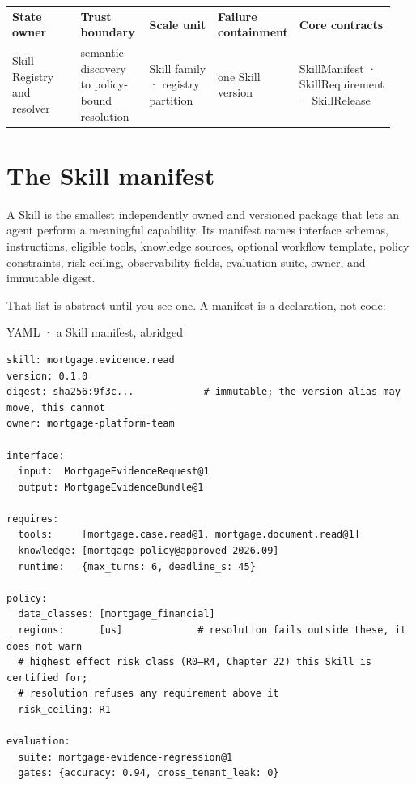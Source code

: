 \BookTableStart
\fontsize{7.2}{9}\selectfont
\begin{tabular}{@{}Y{0.1880\linewidth}Y{0.1880\linewidth}Y{0.1880\linewidth}Y{0.1880\linewidth}Y{0.1880\linewidth}@{}}
\color{white}\bfseries \textbf{State owner} & \color{white}\bfseries \textbf{Trust boundary} & \color{white}\bfseries \textbf{Scale unit} & \color{white}\bfseries \textbf{Failure containment} & \color{white}\bfseries \textbf{Core contracts} \\
Skill Registry and resolver & semantic discovery to policy-bound resolution & Skill family · registry partition & one Skill version & SkillManifest · SkillRequirement · SkillRelease \\
\end{tabular}
\BookTableEnd

\section{The Skill manifest}

A Skill is the smallest independently owned and versioned package that lets an agent perform a meaningful capability. Its manifest names interface schemas, instructions, eligible tools, knowledge sources, optional workflow template, policy constraints, risk ceiling, observability fields, evaluation suite, owner, and immutable digest.\par

That list is abstract until you see one. A manifest is a declaration, not code:\par

YAML · a Skill manifest, abridged\par

\needspace{240.8pt}
\begin{lstlisting}[style=bookcode,title={YAML},language=bookyaml]
skill: mortgage.evidence.read
version: 0.1.0
digest: sha256:9f3c...            # immutable; the version alias may move, this cannot
owner: mortgage-platform-team

interface:
  input:  MortgageEvidenceRequest@1
  output: MortgageEvidenceBundle@1

requires:
  tools:     [mortgage.case.read@1, mortgage.document.read@1]
  knowledge: [mortgage-policy@approved-2026.09]
  runtime:   {max_turns: 6, deadline_s: 45}

policy:
  data_classes: [mortgage_financial]
  regions:      [us]             # resolution fails outside these, it does not warn
  # highest effect risk class (R0–R4, Chapter 22) this Skill is certified for;
  # resolution refuses any requirement above it
  risk_ceiling: R1

evaluation:
  suite: mortgage-evidence-regression@1
  gates: {accuracy: 0.94, cross_tenant_leak: 0}
\end{lstlisting}

